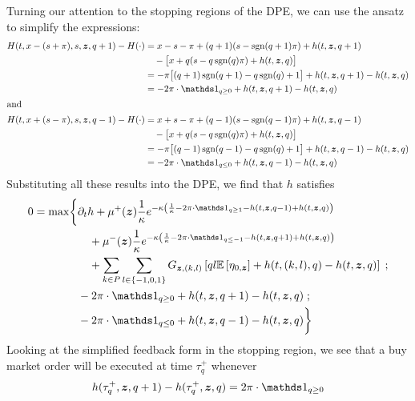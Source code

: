 Turning our attention to the stopping regions of the DPE, we can use the ansatz to simplify the expressions:
\begin{align*}
H(t,x-(s+\pi), s, \bz, q+1) - H(\cdot) & = x - s - \pi + (q+1)(s - \sgn(q+1)\pi) + h(t, \bz, q+1) \\
& \quad - \bigl[ x + q(s - q\sgn(q)\pi) + h(t,\bz,q) \bigr] \\
& = -\pi \bigl[ (q+1)\sgn(q+1) - q\sgn(q) + 1 \bigr] + h(t, \bz, q+1) - h(t,\bz,q)  \\
& = - 2 \pi \cdot \indicator_{q \geq 0} + h(t, \bz, q+1) - h(t,\bz,q) \\
\intertext{and}
H(t,x+(s-\pi), s, \bz, q-1) - H(\cdot) & = x + s - \pi + (q-1)(s - \sgn(q-1)\pi) + h(t, \bz, q-1)\\
& \quad - \bigl[ x + q(s - q\sgn(q)\pi) + h(t,\bz,q) \bigr] \\
& = - \pi \bigl[ (q-1)\sgn(q-1) - q\sgn(q) + 1 \bigr] + h(t, \bz, q-1) - h(t,\bz,q)  \\
& = -2 \pi \cdot \indicator_{q \leq 0} + h(t, \bz, q-1) - h(t,\bz,q) \\ 
\end{align*}
Substituting all these results into the DPE, we find that $h$ satisfies
\begin{equation}\label{eq:PDEcase1}
\begin{split}
0 = \max \biggl\lbrace & \partial_t h + \mu^+(\bz) \frac{1}{\kappa} e^{ -\kappa \left( \frac{1}{\kappa} - 2 \pi \cdot \indicator_{q \geq 1} - h(t,\bz,q-1) + h(t,\bz,q)  \right)} \\
& \quad + \mu^-(\bz) \frac{1}{\kappa} e^{ -\kappa \left( \frac{1}{\kappa} - 2 \pi \cdot \indicator_{q \leq -1} - h(t,\bz,q+1) + h(t,\bz,q) \right)} \\
& \quad + \sum_{k\in P} \sum_{l \in \{-1,0,1\}} G_{\bz,(k,l)} \left[ ql \E \left[ \eta_{0,\bz} \right] + h(t,(k,l),q) - h(t,\bz,q) \right] \; ; \\
& -2 \pi \cdot \indicator_{q \geq 0} + h(t, \bz, q+1) - h(t,\bz,q)   \; ; \\
& -2 \pi \cdot \indicator_{q \leq 0} + h(t, \bz, q-1) - h(t,\bz,q)  \biggr\rbrace
\end{split}
\end{equation}
Looking at the simplified feedback form in the stopping region, we see that a buy market order will be executed at time $\tau^+_q$ whenever
\begin{equation}
\label{eq:buyMOfeedbackcase1}
h(\tau^+_q, \bz, q+1) - h(\tau^+_q,\bz,q) = 2 \pi \cdot \indicator_{q \geq 0}
\end{equation}
